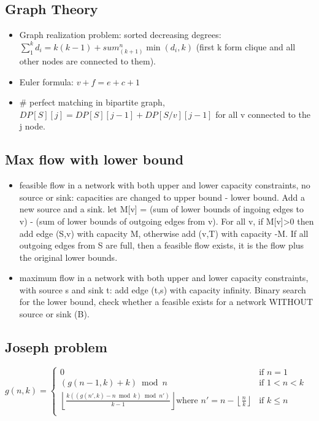 \subsection{Graph Theory}
\begin{itemize}
\item Graph realization problem: sorted decreasing degrees: $\sum_1^k d_i = k(k-1)+sum_(k+1)^n \min(d_i,k)$ (first k form clique and all other nodes are connected to them).
\item Euler formula: $v+f = e+c+1$
\item \# perfect matching in bipartite graph, $DP[S][j] = DP[S][j-1] + DP[S/{v}][j-1]$ for all v connected to the j node.
\end{itemize}
\hrulefill
\subsection{Max flow with lower bound}
\begin{itemize}
\item feasible flow in a network with both upper and lower capacity constraints, no source or sink: capacities are changed to upper bound - lower bound. Add a new source and a sink. let M[v] = (sum of lower bounds of ingoing edges to v) - (sum of lower bounds of outgoing edges from v). For all v, if M[v]>0 then add edge (S,v) with capacity M, otherwise add (v,T) with capacity -M. If all outgoing edges from S are full, then a feasible flow exists, it is the flow plus the original lower bounds.
\item maximum flow in a network with both upper and lower capacity constraints, with source s and sink t: add edge (t,s) with capacity infinity. Binary search for the lower bound, check whether a feasible exists for a network WITHOUT source or sink (B).
\end{itemize}
\hrulefill
\subsection{Joseph problem}
${\displaystyle g(n,k)={\begin{cases}
 0 & {\text{if }}n=1\\
 (g(n-1,k)+k){\bmod {n}}&{\text{if }} 1<n<k\\
 \left\lfloor {\frac {k((g(n',k)-n{\bmod {k}}){\bmod {n}}')}{k-1}}\right\rfloor {\text{where }}n'=n-\left\lfloor {\frac {n}{k}}\right\rfloor &{\text{if }}k\leq n\\
 \end{cases}}}$\\
\hrulefill